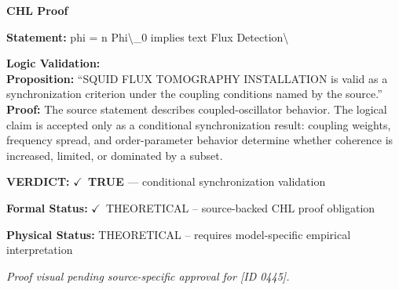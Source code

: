 \vspace{0.45em}
\noindent\textbf{CHL Proof}\par
\textbf{Statement:} phi = n Phi\textbackslash{}\_0 implies text Flux Detection\textbackslash{}

\textbf{Logic Validation:}\\
\textbf{Proposition:} ``SQUID FLUX TOMOGRAPHY INSTALLATION is valid as a synchronization criterion under the
coupling conditions named by the source.''\\
\textbf{Proof:} The source statement describes coupled-oscillator behavior. The logical claim is
accepted only as a conditional synchronization result: coupling weights, frequency
spread, and order-parameter behavior determine whether coherence is increased, limited,
or dominated by a subset.

\textbf{VERDICT:} \ensuremath{\checkmark}\ \textbf{TRUE} --- conditional synchronization validation

\textbf{Formal Status:} \ensuremath{\checkmark}\ THEORETICAL -- source-backed CHL proof obligation

\textbf{Physical Status:} THEORETICAL -- requires model-specific empirical interpretation
\par\vspace{0.45em}
\par
\vfill
\begingroup\footnotesize\itshape
Proof visual pending source-specific approval for [ID 0445].
\par\endgroup
\vfill
\endgroup
\endgroup
